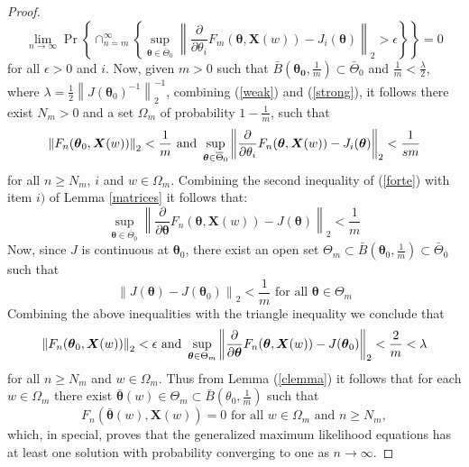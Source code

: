 \documentclass[10pt,a4paper,onecolumn]{article} %
\newcommand{\f}{\on}
\newcommand{\bs}{\boldsymbol}
\newcommand{\on}{\operatorname}
\begin{document}
\begin{appendix}
\begin{proof}
\begin{equation}\label{strong}\lim_{n\to \infty}\f{Pr} \left\{\cap_{n=m}^\infty\left\{\sup_{\bs{\theta}\in \overline{\Theta}_0}\left\|\frac{\partial }{\partial \theta_i}F_m(\bs{\theta},\bs{X}(w)) - J_i(\bs{\theta})\right\|_2 > \epsilon\right\}\right\} = 0
\end{equation}
for all $\epsilon>0$ and $i$. Now, given $m>0$ such that $\bar{B}\left(\bs{\theta_0},\frac{1}{m}\right)\subset \bar{\Theta}_0$ and $\frac{1}{m}<\frac{\lambda}{2}$, where $\lambda = \frac{1}{2}\left\|J(\bs{\theta}_0)^{-1}\right\|_2^{-1}$, combining 
(\ref{weak}) and (\ref{strong}), it follows there exist $N_m>0$ and a set $\Omega_m$ of probability $1-\frac{1}{m}$, such that
\begin{equation}\label{forte}\left\|F_{n}(\bs{\theta}_0,\bs{X}(w))\right\|_2<\frac{1}{m}\mbox{ and }\\
\sup_{\bs{\theta}\in \overline{\Theta}_0}\left\|\frac{\partial}{\partial \theta_i}F_n(\bs{\theta},\bs{X}(w))-J_i(\bs{\theta})\right\|_2< \frac{1}{sm}
\end{equation}
for all $n\geq N_{m}$, $i$ and $w\in \Omega_{m}$. Combining the second inequality of (\ref{forte}) with item $i)$ of Lemma \ref{matrices} it follows that:
\begin{equation*}
\sup_{\bs{\theta}\in \overline{\Theta}_0}\left\|\frac{\partial}{\partial \bs{\theta}}F_n(\bs{\theta},\bs{X}(w))-J(\bs{\theta})\right\|_2< \frac{1}{m}
\end{equation*}
Now, since $J$ is continuous at $\bs{\theta}_0$, there exist an open set $\Theta_m\subset\bar{B}(\bs{\theta}_0,\frac{1}{m}) \subset \bar{\Theta}_0$ such that
\begin{equation}\label{ineqJ}\left\|J(\bs{\theta})-J(\bs{\theta}_0)\right\|_2<\frac{1}{m}\mbox{ for all }\bs{\theta}\in \Theta_{m}
\end{equation}
Combining the above inequalities with the triangle inequality we conclude that
\begin{equation}\label{ineqfin1}\left\|F_{n}(\bs{\theta}_0,\bs{X}(w))\right\|_2<\epsilon\mbox{ and }\\
\sup_{\bs{\theta}\in \Theta_m}\left\|\frac{\partial}{\partial \bs{\theta}}F_n(\bs{\theta},\bs{X}(w))-J(\bs{\theta}_0)\right\|_2< \frac{2}{m}<\lambda
\end{equation}
for all $n\geq N_m$ and $w\in \Omega_m$. Thus from Lemma (\ref{clemma}) it follows that for each $w\in \Omega_m$ there exist $\bs{\bar{\theta}}(w)\in \Theta_m\subset \bar{B}(\theta_0,\frac{1}{m})$ such that
\begin{equation}\label{eqfin1}F_n(\bs{\bar{\theta}}(w),\bs{X}(w))=0\mbox{ for all }w\in \Omega_m\mbox{ and }n\geq N_m,
\end{equation}
which, in special, proves that the generalized maximum likelihood equations has at least one solution with probability converging to one as $n\to \infty$.


\end{proof}
\end{appendix}
\end{document}
